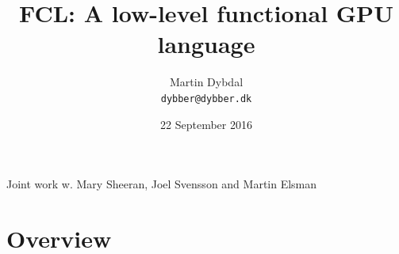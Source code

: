 \documentclass{beamer}
\title[FCL] %
  {FCL: A low-level functional GPU language} %
\author{\footnotesize{Martin Dybdal} \\ \footnotesize{\texttt{dybber@dybber.dk}}}
\institute {
DIKU \\
University of Copenhagen
}
\date{22 September 2016}
\begin{document}
{
\begin{frame}
  \titlepage

  \begin{center} {\small Joint work w. Mary Sheeran, Joel Svensson and
      Martin Elsman}
  \end{center}


\end{frame}
}





\section{Overview}

\end{document}
